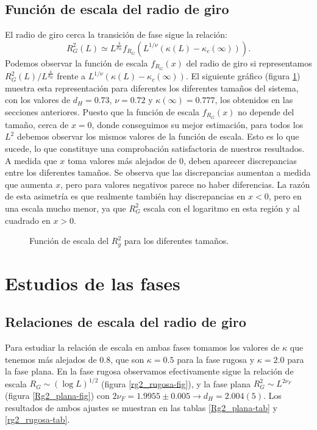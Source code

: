 \subsection{Función de escala del radio de giro}
El radio de giro cerca la transición de fase sigue la relación:
\begin{equation}
    R^2_G(L)\simeq L^{\frac{4}{d_H}}f_{R_G}\left(L^{1/\nu}(\kappa(L)-\kappa_c(\infty))\right).
\end{equation}
Podemos observar la función de escala $f_{R_G}(x)$ del radio de giro si
representamos $R^2_G(L)/ L^{\frac{4}{d_H}}$ frente a
$L^{1/\nu}(\kappa(L)-\kappa_c(\infty))$. El siguiente gráfico (figura
\ref{funcion_escala_rg2-fig}) muestra esta representación para diferentes los
diferentes tamaños del sistema, con los valores de $d_H=0.73$, $\nu=0.72$ y
$\kappa(\infty)=0.777$, los obtenidos en las secciones anteriores. Puesto que
la función de escala $f_{R_G}(x)$ no depende del tamaño, cerca de $x=0$, donde
conseguimos su mejor estimación, para todos los $L^2$ debemos observar los
mismos valores de la función de escala. Esto es lo que sucede, lo que
constituye una comprobación satisfactoria de nuestros resultados. A medida que
$x$ toma valores más alejados de $0$, deben aparecer discrepancias entre los
diferentes tamaños. Se observa que las discrepancias aumentan a medida que
aumenta $x$, pero para valores negativos parece no haber diferencias.  La
razón de esta asimetría es que realmente también hay discrepancias en $x<0$, pero en una escala mucho
menor, ya que $R_G^2$ escala con el logaritmo en esta región y al cuadrado en
$x>0$. 
\begin{figure}[h]
  \centering
  
  \caption{Función de escala del $R^2_g$ para los diferentes tamaños.}\label{funcion_escala_rg2-fig}
\end{figure}

\clearpage


\section{Estudios de las fases}

\subsection{Relaciones de escala del radio de giro}

Para estudiar la relación de escala en ambas fases tomamos los valores de $\kappa$ que tenemos
más alejados de $0.8$, que son $\kappa=0.5$ para la fase rugosa y $\kappa=2.0$
para la fase plana. En la fase rugosa observamos efectivamente sigue la
relación de escala $R_G\sim (\log L)^{1/2}$ (figura \ref{rg2_rugosa-fig}), y la
fase plana $R_G^2\sim L^{2\nu_F}$ (figura \ref{Rg2_plana-fig}) con $2\nu_F=1.9955 \pm
0.005\rightarrow d_H=2.004(5)$. Los resultados de ambos ajustes se muestran en
las tablas \ref{Rg2_plana-tab} y \ref{rg2_rugosa-tab}.

